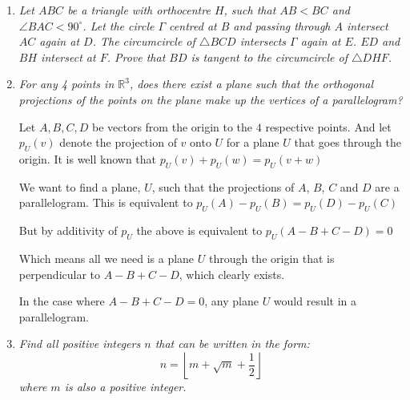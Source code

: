 \documentclass{article}
\begin{document}
\begin{enumerate}

\medskip
\item %
{\itshape Let $ABC$ be a triangle with orthocentre $H$, such that $AB<BC$ and $\angle BAC < 90^\circ$. Let the circle $\Gamma$ centred at $B$ and passing through $A$ intersect $AC$ again at $D$. The circumcircle of $\triangle BCD$ intersects $\Gamma$ again at $E$. $ED$ and $BH$ intersect at $F$. Prove that $BD$ is tangent to the circumcircle of $\triangle DHF$.
}


\medskip
\item %
{\itshape For any 4 points in $\mathbb{R}^3$, does there exist a plane such that the orthogonal projections of the points on the plane make up the vertices of a parallelogram?

}
Let $A,B,C,D$ be vectors from the origin to the $4$ respective points.
And let $p_U(v)$ denote the projection of $v$ onto $U$ for a plane $U$ that goes through the origin. It is well known that $p_U(v) + p_U(w) = p_U(v + w)$

We want to find a plane, $U$, such that the projections of $A$, $B$, $C$ and $D$ are a parallelogram. This is equivalent to
$p_U(A) - p_U(B) = p_U(D) - p_U(C)$

But by additivity of $p_U$ the above is equivalent to
$p_U(A - B + C - D) = 0$

Which means all we need is a plane $U$ through the origin that is perpendicular to $A - B + C - D$, which clearly exists.

In the case where $A - B + C - D = 0$, any plane $U$ would result in a parallelogram.

\medskip
\item %
{\itshape Find all positive integers $n$ that can be written in the form:
$$n = \left\lfloor m + \sqrt{m} + \frac{1}{2} \right\rfloor$$
where $m$ is also a positive integer.}


\end{enumerate}
\end{document}
